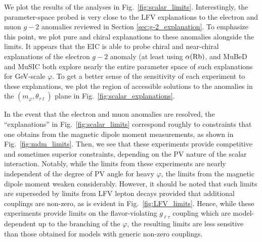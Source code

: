 We plot the results of the analyses in Fig.~\ref{fig:scalar_limits}. Interestingly, the parameter-space probed is very close to the LFV explanations to the electron and muon $g-2$ anomalies reviewed in Section \ref{sec:g-2_explanation}. To emphasize this point, we plot pure and chiral explanations to these anomalies alongside the limits. It appears that the EIC is able to probe chiral and near-chiral explanations of the electron $g-2$ anomaly (at least using $\alpha({\rm Rb})$, and MuBeD and MuSIC both explore nearly the entire parameter space of such explanations for GeV-scale $\varphi$. To get a better sense of the sensitivity of each experiment to these explanations, we plot the region of accessible solutions to the anomalies in the $(m_\varphi, \theta_{\tau\ell})$ plane in Fig.~\ref{fig:scalar_explanations}. 

In the event that the electron and muon anomalies are resolved, the ``explanations'' in Fig.~\ref{fig:scalar_limits} correspond roughly to constraints that one obtains from the magnetic dipole moment measurements, as shown in Fig.~\ref{fig:mdm_limits}. Then, we see that these experiments provide competitive and sometimes superior constraints, depending on the PV nature of the scalar interaction. Notably, while the limits from these experiments are nearly independent of the degree of PV angle for heavy $\varphi$, the limits from the magnetic dipole moment weaken considerably. However, it should be noted that such limits are superseded by limits from LFV lepton decays provided that additional couplings are non-zero, as is evident in Fig.~\ref{fig:LFV_limits}. Hence, while these experiments provide limits on the flavor-violating $g_{\ell\tau}$ coupling which are model-dependent up to the branching of the $\varphi$, the resulting limits are less sensitive than those obtained for models with generic non-zero couplings.
